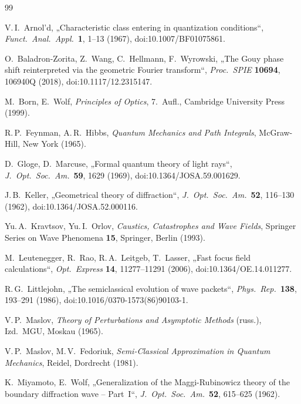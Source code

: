 \documentclass[11pt,a4paper]{scrartcl}
\theoremstyle{insightstyle}
\begin{document}
\begin{thebibliography}{99}

 V.\,I.~Arnol'd, „Characteristic class entering in quantization conditions“, \emph{Funct.\ Anal.\ Appl.}\ \textbf{1}, 1--13 (1967), doi:10.1007/BF01075861.

 O.~Baladron-Zorita, Z.~Wang, C.~Hellmann, F.~Wyrowski, „The Gouy phase shift reinterpreted via the geometric Fourier transform“, \emph{Proc.\ SPIE} \textbf{10694}, 106940Q (2018), doi:10.1117/12.2315147.

 M.~Born, E.~Wolf, \emph{Principles of Optics}, 7.~Aufl., Cambridge University Press (1999).

 R.\,P.~Feynman, A.\,R.~Hibbs, \emph{Quantum Mechanics and Path Integrals}, McGraw-Hill, New York (1965).

 D.~Gloge, D.~Marcuse, „Formal quantum theory of light rays“, \emph{J.\ Opt.\ Soc.\ Am.}\ \textbf{59}, 1629 (1969), doi:10.1364/JOSA.59.001629.

 J.\,B.~Keller, „Geometrical theory of diffraction“, \emph{J.\ Opt.\ Soc.\ Am.}\ \textbf{52}, 116--130 (1962), doi:10.1364/JOSA.52.000116.

 Yu.\,A.~Kravtsov, Yu.\,I.~Orlov, \emph{Caustics, Catastrophes and Wave Fields}, Springer Series on Wave Phenomena \textbf{15}, Springer, Berlin (1993).

 M.~Leutenegger, R.~Rao, R.\,A.~Leitgeb, T.~Lasser, „Fast focus field calculations“, \emph{Opt.\ Express} \textbf{14}, 11277--11291 (2006), doi:10.1364/OE.14.011277.

 R.\,G.~Littlejohn, „The semiclassical evolution of wave packets“, \emph{Phys.\ Rep.}\ \textbf{138}, 193--291 (1986), doi:10.1016/0370-1573(86)90103-1.

 V.\,P.~Maslov, \emph{Theory of Perturbations and Asymptotic Methods} (russ.), Izd.\ MGU, Moskau (1965).

 V.\,P.~Maslov, M.\,V.~Fedoriuk, \emph{Semi-Classical Approximation in Quantum Mechanics}, Reidel, Dordrecht (1981).

 K.~Miyamoto, E.~Wolf, „Generalization of the Maggi-Rubinowicz theory of the boundary diffraction wave -- Part~I“, \emph{J.\ Opt.\ Soc.\ Am.}\ \textbf{52}, 615--625 (1962).


\end{thebibliography}
\end{document}

